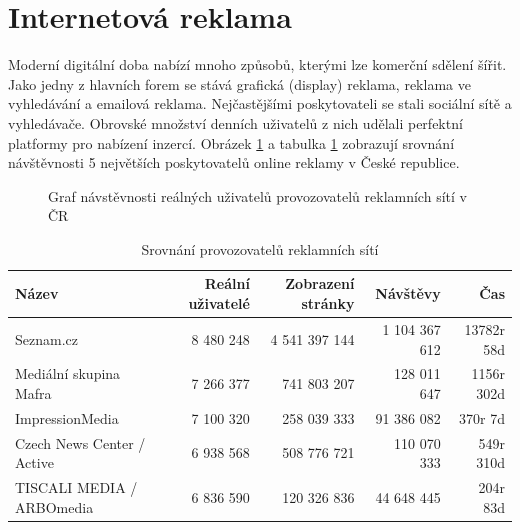 \section{Internetová reklama}\label{sec:online-ad}
Moderní digitální doba nabízí mnoho způsobů, kterými lze komerční sdělení šířit. Jako jedny z hlavních forem se stává grafická (display) reklama,
reklama ve vyhledávání a emailová reklama. Nejčastějšími poskytovateli se stali sociální sítě a vyhledávače.
Obrovské množství denních uživatelů z nich udělali perfektní platformy pro nabízení inzercí.
Obrázek \ref{fig:spir-publishers} a tabulka \ref{tab:spir-publishers} zobrazují srovnání návštěvnosti 5 největších poskytovatelů online reklamy v České republice.

\begin{figure}[h]
    \centering
    \caption[Graf návštěvosti provozovatelů reklamních sítí]{Graf návstěvnosti reálných uživatelů provozovatelů reklamních sítí v ČR \cite{gemius:rating}}
    \label{fig:spir-publishers}
    
\end{figure}

\begin{table}[hb]
    \centering
    \caption[Srovnání provozovatelů reklamních sítí]{Srovnání provozovatelů reklamních sítí \cite{gemius:rating}}
	\label{tab:spir-publishers}
    \begin{tabular}{l|r|r|r|r}
        \toprule
            Název & Reální uživatelé & Zobrazení stránky & Návštěvy & Čas \\
        \midrule
            Seznam.cz & 8 480 248 & 4 541 397 144  & 1 104 367 612 & 13782r 58d  \\
            Mediální skupina Mafra & 7 266 377 & 741 803 207  & 128 011 647  & 1156r 302d \\
            ImpressionMedia & 7 100 320  & 258 039 333 & 91 386 082 & 370r 7d  \\
            Czech News Center / Active & 6 938 568 & 508 776 721 & 110 070 333  & 549r 310d  \\
            TISCALI MEDIA / ARBOmedia & 6 836 590 & 120 326 836  & 44 648 445 & 204r 83d  \\
        \midrule
        
    \end{tabular}
\end{table}


